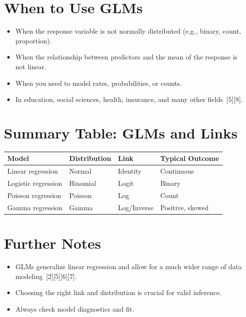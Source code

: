 \documentclass[11pt]{article}
\begin{document}
\section{When to Use GLMs}

\begin{itemize}
    \item When the response variable is not normally distributed (e.g., binary, count, proportion).
    \item When the relationship between predictors and the mean of the response is not linear.
    \item When you need to model rates, probabilities, or counts.
    \item In education, social sciences, health, insurance, and many other fields\ [5][8].
\end{itemize}

\section{Summary Table: GLMs and Links}

\begin{tabular}{|l|l|l|l|}
\hline
\textbf{Model} & \textbf{Distribution} & \textbf{Link} & \textbf{Typical Outcome} \\
\hline
Linear regression & Normal & Identity & Continuous \\
Logistic regression & Binomial & Logit & Binary \\
Poisson regression & Poisson & Log & Count \\
Gamma regression & Gamma & Log/Inverse & Positive, skewed \\
\hline
\end{tabular}

\section{Further Notes}

\begin{itemize}
    \item GLMs generalize linear regression and allow for a much wider range of data modeling\ [2][5][6][7].
    \item Choosing the right link and distribution is crucial for valid inference.
    \item Always check model diagnostics and fit.
\end{itemize}
\end{document}
